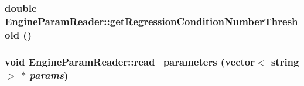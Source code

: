 \label{classEngineParamReader_aaf990b2dfcdb336b1ae0ee368518bca5}
\hypertarget{classEngineParamReader_ade1f5ccf0bd5c7cb748ca66fd332cbd0}{
\subsubsection[{getRegressionConditionNumberThreshold}]{\setlength{\rightskip}{0pt plus 5cm}double EngineParamReader::getRegressionConditionNumberThreshold ()}}
\label{classEngineParamReader_ade1f5ccf0bd5c7cb748ca66fd332cbd0}
\hypertarget{classEngineParamReader_a6205586b208453840260a6203f605037}{
\subsubsection[{read\_\-parameters}]{\setlength{\rightskip}{0pt plus 5cm}void EngineParamReader::read\_\-parameters (vector$<$ string $>$ $\ast$ {\em params})}}
\label{classEngineParamReader_a6205586b208453840260a6203f605037}


